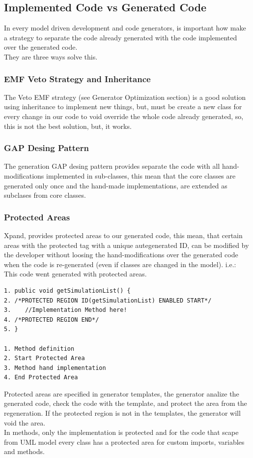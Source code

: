 \subsection{Implemented Code vs Generated Code}
In every model driven development and code generators, is important how make a
strategy to separate the code already generated with the code implemented over
the generated code.\\
They are three ways solve this.

\subsubsection{EMF Veto Strategy and Inheritance}
The Veto EMF strategy (see Generator Optimization section) is a good solution
using inheritance to implement new things, but, must be create a new class for every change in our code to void
override the whole code already generated, so, this is not the best solution,
but, it works.

\subsubsection{GAP Desing Pattern}
The generation GAP desing pattern provides separate the code with all
hand-modifications implemented in sub-classes, this mean that the core classes
are generated only once and the hand-made implementations, are extended as
subclases from core classes.

\subsubsection{Protected Areas}
Xpand, provides protected areas to our generated code, this mean, that certain
areas with the protected tag with a unique autegenerated ID, can be modified by
the developer without loosing the hand-modifications over the generated code
when the code is re-generated (even if classes are changed in the model).
i.e.: This code went generated with protected areas.
\begin{verbatim}
1. public void getSimulationList() {
2. /*PROTECTED REGION ID(getSimulationList) ENABLED START*/
3.    //Implementation Method here!
4. /*PROTECTED REGION END*/
5. }

1. Method definition
2. Start Protected Area
3. Method hand implementation
4. End Protected Area
\end{verbatim}
Protected areas are specified in generator templates, the generator analize the
generated code, check the code with the template, and protect the area from the
regeneration. If the protected region is not in the templates, the generator
will void the area.\\
In methods, only the implementation is protected and for the code that scape
from UML model every class has a protected area for custom imports, variables and methods.

